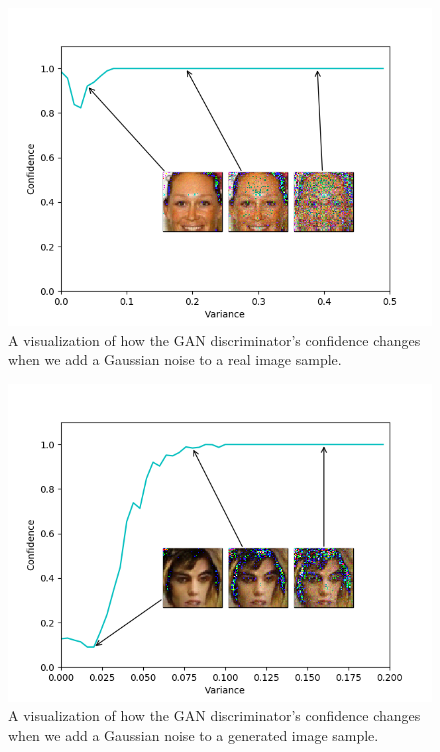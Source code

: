 \begin{figure}[h!]
	\includegraphics[width=\textwidth]{figures/diversity_gan2_real_dis_real_images}
	\caption{A visualization of how the GAN discriminator's confidence changes when we add a Gaussian noise to a real image sample.}
	\label{fig:changed_real_image_real_dis}
\end{figure}

\begin{figure}[h!]
	\includegraphics[width=\textwidth]{figures/diversity_gan2_fake_dis_gen_images}
	\caption{A visualization of how the GAN discriminator's confidence changes when we add a Gaussian noise to a generated image sample.}
	\label{fig:changed_gen_image_fake_dis}
\end{figure}

